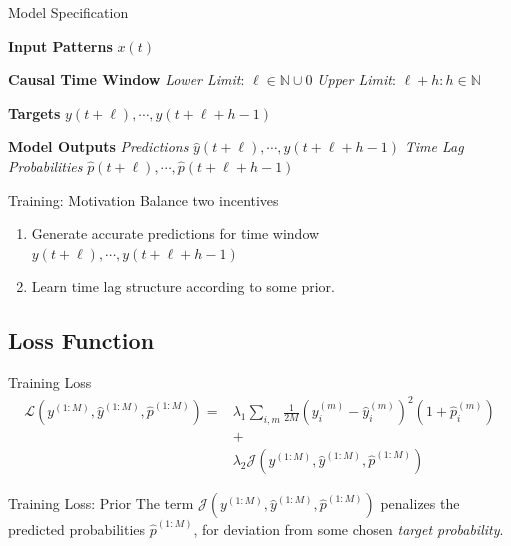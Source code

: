 \documentclass{beamer}
\begin{document}
\begin{frame}{Model Specification}

\textbf{Input Patterns} $x(t)$ \newline

\textbf{Causal Time Window} \newline
\textit{Lower Limit}: $\ell \in \mathbb{N} \cup 0$ \newline
\textit{Upper Limit}: $\ell + h: h \in \mathbb{N}$ \newline

\textbf{Targets} $y(t+\ell), \cdots, y(t+\ell+h-1)$ \newline

\textbf{Model Outputs} \newline
\textit{Predictions} $\hat{y}(t+\ell), \cdots, \hat{y}(t+\ell+h-1)$ \newline
\textit{Time Lag Probabilities} $\hat{p}(t+\ell), \cdots, \hat{p}(t+\ell+h-1)$
    
\end{frame}

\begin{frame}{Training: Motivation}
Balance two incentives

\begin{enumerate}
    \item Generate accurate predictions for time window $y(t+\ell), \cdots, y(t+\ell+h-1)$
    \item Learn time lag structure according to some prior.
\end{enumerate}
\end{frame}

\subsection{Loss Function}
\begin{frame}{Training Loss}
\begin{align*}
\mathcal{L}(y^{(1:M)}, \hat{y}^{(1:M)}, \hat{p}^{(1:M)}) = &\lambda_1 \sum_{i,m}{\frac{1}{2M} (y^{(m)}_{i} - \hat{y}^{(m)}_{i})^2 (1 + \hat{p}^{(m)}_i)} \\ &+ \\ &\lambda_2 \mathcal{J}(y^{(1:M)}, \hat{y}^{(1:M)}, \hat{p}^{(1:M)})
\end{align*}
\end{frame}

\begin{frame}{Training Loss: Prior}
The term $\mathcal{J}(y^{(1:M)}, \hat{y}^{(1:M)}, \hat{p}^{(1:M)})$ penalizes the predicted probabilities $\hat{p}^{(1:M)}$, for deviation from some chosen \textit{target probability}.
    
\end{frame}
\end{document}
